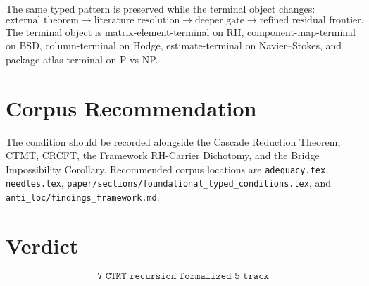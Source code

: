 \documentclass{article}
\begin{document}
The same typed pattern is preserved while the terminal object changes:
\[
\text{external theorem}
\to
\text{literature resolution}
\to
\text{deeper gate}
\to
\text{refined residual frontier}.
\]
The terminal object is matrix-element-terminal on RH, component-map-terminal on BSD, column-terminal on Hodge, estimate-terminal on Navier--Stokes, and package-atlas-terminal on P-vs-NP.

\section{Corpus Recommendation}

The condition should be recorded alongside the Cascade Reduction Theorem, CTMT, CRCFT, the Framework RH-Carrier Dichotomy, and the Bridge Impossibility Corollary. Recommended corpus locations are \texttt{adequacy.tex}, \texttt{needles.tex}, \texttt{paper/sections/foundational\_typed\_conditions.tex}, and \texttt{anti\_loc/findings\_framework.md}.

\section{Verdict}

\[
\boxed{\texttt{V\_CTMT\_recursion\_formalized\_5\_track}}
\]
\end{document}

